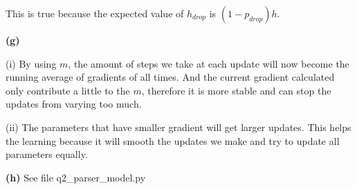 \documentclass[10pt, a4paper]{ctexart}
\begin{document}
This is true because the expected value of $h_{drop}$ is $(1-p_{drop})h$.\par
{\bf{(g)}}\par
(i) By using $m$, the amount of steps we take at each update will now become the running average of gradients of all times. And the current gradient calculated only contribute a little to the $m$, therefore it is more stable and can stop the updates from varying too much.\par
(ii) The parameters that have smaller gradient will get larger updates. This helps the learning because it will smooth the updates we make and try to update all parameters equally.\par
{\bf{(h)}} See file q2\_parser\_model.py
\end{document}
